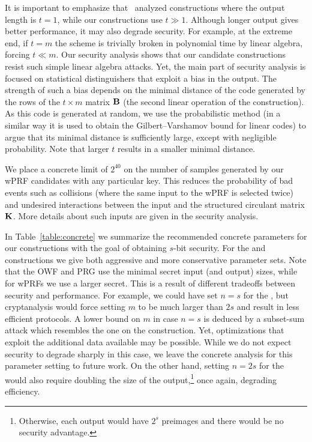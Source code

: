 It is important to emphasize that~\cite{cheon2020-adventures} analyzed constructions where the output length is $t=1$,
while our constructions use $t \gg 1$.
Although longer output gives better performance, it may also degrade security.
For example, at the extreme end, if $t = m$ the scheme is trivially broken in polynomial time by linear algebra,
forcing $t \ll m$.
Our security analysis shows that our candidate constructions resist such simple linear algebra attacks.
Yet, the main part of security analysis is focused on statistical distinguishers that exploit a bias in the output.
The strength of such a bias depends on the minimal distance of the
code generated by the rows of the $t \times m$ matrix $\mat{B}$
(the second linear operation of the construction).
As this code is generated at random, we use the probabilistic method
(in a similar way it is used to obtain the Gilbert–Varshamov bound for linear codes)
to argue that its minimal distance is sufficiently large, except with negligible probability.
Note that larger $t$ results in a smaller minimal distance.

We place a concrete limit of $2^{40}$ on the number of samples generated by our wPRF candidates
with any particular key. This reduces the probability of bad events such as collisions
(where the same input to the wPRF is selected twice) and undesired interactions
between the input and the structured circulant matrix $\mat{K}$.
More details about such inputs are given in the security analysis.

In Table~\ref{table:concrete} we summarize the recommended
concrete parameters for our constructions
with the goal of obtaining $s$-bit security. For the \ttOWF and \ttwPRF constructions
we give both aggressive and more conservative parameter sets.
Note that the OWF and PRG use the minimal secret input (and output)
sizes, while for wPRFs we use a larger secret.
This is a result of different tradeoffs between security and performance.
For example, we could have set $n = s$ for the \ttwPRF, but cryptanalysis would
force setting $m$ to be much larger than $2s$ and result in less efficient protocols.
A lower bound on $m$ in case $n=s$ is deduced by a subset-sum attack which resembles the one 
on the \ttOWF construction. Yet, optimizations that exploit the additional data available 
may be possible. While we do not expect security to degrade sharply in this case,
we leave the concrete analysis for this parameter setting to future work.
On the other hand, setting $n = 2s$ for the \ttOWF would also require
doubling the size of the output,\footnote{
Otherwise, each output would have $2^s$ preimages and there would be no security advantage.}
once again, degrading efficiency.

